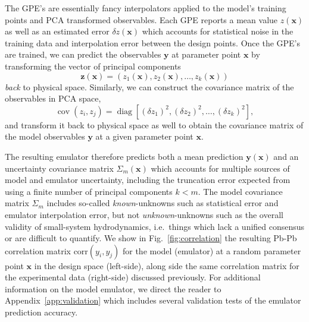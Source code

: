 \documentclass[aps,prc,reprint,amsmath,nofootinbib]{revtex4-1}
\newcommand{\xv}{\mathbf x}
\newcommand{\yv}{\mathbf y}
\DeclareMathOperator{\diag}{diag}
\DeclareMathOperator{\cov}{cov}
\begin{document}
The GPE's are essentially fancy interpolators applied to the model's training points and PCA transformed observables.
Each GPE reports a mean value $z(\xv)$ as well as an estimated error $\delta z(\xv)$ which accounts for statistical noise in the training data and interpolation error between the design points.
Once the GPE's are trained, we can predict the observables $\yv$ at parameter point $\xv$ by transforming the vector of principal components
\begin{equation}
  \mathbf{z}(\xv) = (z_1(\xv), z_2(\xv), \dots, z_k(\xv))
\end{equation}
\emph{back} to physical space.
Similarly, we can construct the covariance matrix of the observables in PCA space,
\begin{equation}
  \cov(z_i, z_j) = \diag[(\delta z_{1})^2, (\delta z_2)^2, \dots, (\delta z_k)^2 ],
\end{equation}
and transform it back to physical space as well to obtain the covariance matrix of the model observables $\yv$ at a given parameter point $\xv$.

The resulting emulator therefore predicts both a mean prediction $\yv(\xv)$ and an uncertainty covariance matrix $\Sigma_m(\xv)$ which accounts for multiple sources of model and emulator uncertainty, including the truncation error expected from using a finite number of principal components $k < m$.
The model covariance matrix $\Sigma_m$ includes so-called \emph{known}-unknowns such as statistical error and emulator interpolation error, but not \emph{unknown}-unknowns such as the overall validity of small-system hydrodynamics, i.e.\ things which lack a unified consensus or are difficult to quantify.
We show in Fig.~\ref{fig:correlation} the resulting Pb-Pb correlation matrix $\mathrm{corr}(y_i,y_j)$ for the model (emulator) at a random parameter point $\xv$ in the design space (left-side), along side the same correlation matrix for the experimental data (right-side) discussed previously.
For additional information on the model emulator, we direct the reader to Appendix~\ref{app:validation} which includes several validation tests of the emulator prediction accuracy.
\newpage
\end{document}
